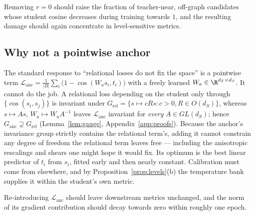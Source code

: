 \begin{prediction}
\label{pred:support}
Removing $r=0$ should raise the fraction of teacher-near, off-graph candidates whose
student cosine decreases during training towards $1$, and the resulting damage should
again concentrate in level-sensitive metrics.
\end{prediction}

\subsection{Why not a pointwise anchor}
\label{sec:anchor}

The standard response to ``relational losses do not fix the space'' is a pointwise term
$\mathcal{L}_{\mathrm{anc}} = \frac{1}{|B|}\sum_{i}\big(1-\cos(W_a s_i, t_i)\big)$ with a
freely learned $W_a\in\R^{d_T\times d_S}$. It cannot do the job. A relational loss depending
on the student only through $\{\cos(s_i,s_j)\}$ is invariant under
$G_{\mathrm{rel}} = \{s\mapsto cRs: c>0, R\in O(d_S)\}$, whereas $s\mapsto As$,
$W_a\mapsto W_aA^{-1}$ leaves $\mathcal{L}_{\mathrm{anc}}$ invariant for \emph{every}
$A\in GL(d_S)$; hence $G_{\mathrm{anc}}\supsetneq G_{\mathrm{rel}}$
(Lemma~\ref{lem:gauge}, Appendix~\ref{app:proofs}). Because the anchor's invariance group
strictly contains the relational term's, adding it cannot constrain any degree of freedom
the relational term leaves free --- including the anisotropic rescalings and shears one might
hope it would fix. Its optimum is the best linear predictor of $t_i$ from $s_i$, fitted early
and then nearly constant. Calibration must come from elsewhere, and by
Proposition~\ref{prop:levels}(b) the temperature bank supplies it within the student's own
metric.

\begin{prediction}
\label{pred:anchor}
Re-introducing $\mathcal{L}_{\mathrm{anc}}$ should leave downstream metrics unchanged, and
the norm of its gradient contribution should decay towards zero within roughly one epoch.
\end{prediction}

